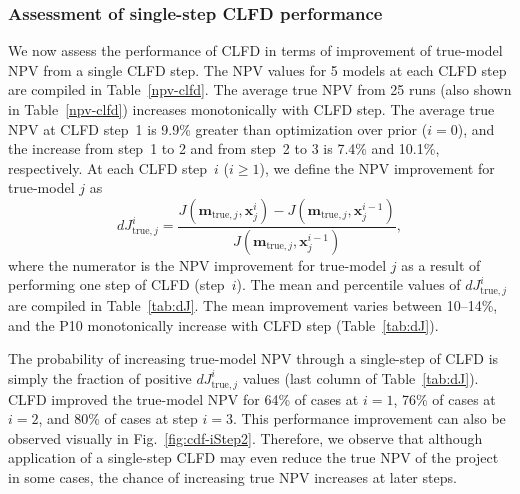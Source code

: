 \documentclass[11pt]{article}
\begin{document}
\subsubsection{Assessment of single-step CLFD performance} \label{results:multiruns}
We now assess the performance of CLFD in terms of improvement of true-model NPV from a single CLFD step.
The NPV values for 5 models at each CLFD step are compiled in Table~\ref{npv-clfd}.
The average true NPV from 25 runs (also shown in Table~\ref{npv-clfd}) increases monotonically with CLFD step.
The average true NPV at CLFD step~1 is 9.9\% greater than optimization over prior ($i=0$),
and the increase from step~1 to 2 and from step~2 to 3 is 7.4\% and 10.1\%, respectively.
At each CLFD step~$i$ ($i\ge 1$), we define the NPV improvement for true-model $j$ as
%
\begin{equation}  \label{eq:dJi}
dJ_{\text{true},j}^{i} =  \frac{J(\mathbf{m}_{\text{true},j},\mathbf{x}^i_j) - J(\mathbf{m}_{\text{true},j},\mathbf{x}^{i-1}_j)}{J(\mathbf{m}_{\text{true},j},\mathbf{x}^{i-1}_j)},
\end{equation}
%
where the numerator is the NPV improvement for true-model $j$ as a result of performing one step of CLFD (step~$i$).
The mean and percentile values of $dJ_{\text{true},j}^{i}$ are compiled in Table~\ref{tab:dJ}.
The mean improvement varies between 10--14\%, and the P10 monotonically increase with CLFD step (Table~\ref{tab:dJ}).

The probability of increasing true-model NPV through a single-step of CLFD is simply the fraction of
positive $dJ_{\text{true},j}^{i}$ values (last column of Table~\ref{tab:dJ}).
CLFD improved the true-model NPV for 64\% of cases at $i=1$,
76\% of cases at $i=2$, and 80\% of cases at step $i=3$.
This performance improvement can also be observed visually in Fig.~\ref{fig:cdf-iStep2}.
Therefore, we observe that although application of a single-step CLFD may even reduce the true NPV of the project in some cases,
the chance of increasing true NPV increases at later steps.
\end{document}
